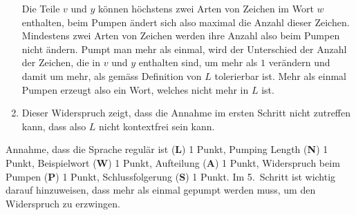 \begin{loesung}
\begin{enumerate}
Die Teile $v$ und $y$ können höchstens zwei Arten von Zeichen im Wort $w$
enthalten, beim Pumpen ändert sich also maximal die Anzahl dieser
Zeichen.
Mindestens zwei Arten von Zeichen werden ihre Anzahl also beim Pumpen
nicht ändern.
Pumpt man mehr als einmal, wird der Unterschied der Anzahl der Zeichen,
die in $v$ und $y$ enthalten sind, um mehr als $1$ verändern und damit
um mehr, als gemäss Definition von $L$ tolerierbar ist.
Mehr als einmal Pumpen erzeugt also ein Wort, welches nicht mehr in
$L$ ist.
\item
Dieser Widerspruch zeigt, dass die Annahme im ersten Schritt nicht
zutreffen kann, dass also $L$ nicht kontextfrei sein kann.
\qedhere
\end{enumerate}
\end{loesung}

\begin{bewertung}
Annahme, dass die Sprache regulär ist ({\bf L}) 1 Punkt,
Pumping Length ({\bf N}) 1 Punkt,
Beispielwort ({\bf W}) 1 Punkt,
Aufteilung ({\bf A}) 1 Punkt,
Widerspruch beim Pumpen ({\bf P}) 1 Punkt,
Schlussfolgerung ({\bf S}) 1 Punkt.
Im 5.~Schritt ist wichtig darauf hinzuweisen,
dass mehr als einmal gepumpt werden muss, um den Widerspruch zu erzwingen.
\end{bewertung}


